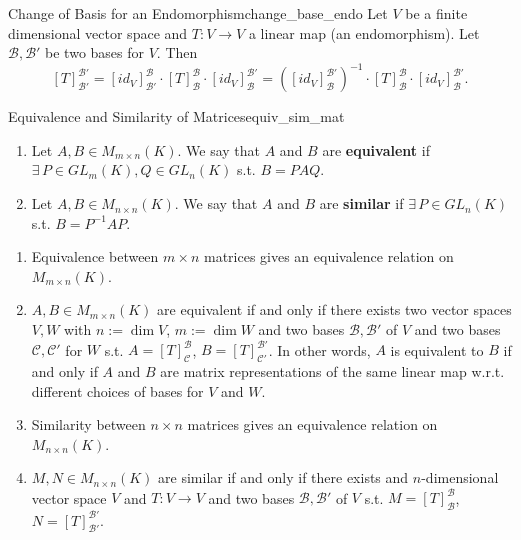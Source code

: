 \begin{corollary}{Change of Basis for an Endomorphism}{change_base_endo}
	Let $V$ be a finite dimensional vector space and $T:V \to V$ a linear map (an endomorphism). Let $\mathcal{B}, \mathcal{B'}$ be two bases for $V$. Then
	\[
	[T]^{\mathcal{B'}}_{\mathcal{B'}} = [id_V]^{\mathcal{B}}_{\mathcal{B'}} \cdot [T]^{\mathcal{B}}_{\mathcal{B}} \cdot [id_V]^{\mathcal{B'}}_{\mathcal{B}} = ([id_V]^{\mathcal{B'}}_{\mathcal{B}})^{-1} \cdot [T]^{\mathcal{B}}_{\mathcal{B}} \cdot [id_V]^{\mathcal{B'}}_{\mathcal{B}}.
	\]
\end{corollary}

\begin{definition}{Equivalence and Similarity of Matrices}{equiv_sim_mat}
	\begin{enumerate}
		\item Let $A, B \in M_{m \times n}(K)$. We say that $A$ and $B$ are \textbf{equivalent} if $\exists\, P \in GL_m(K), Q \in GL_n(K)$ s.t. $B = PAQ$.
		\item Let $A, B \in M_{n \times n}(K)$. We say that $A$ and $B$ are \textbf{similar} if $\exists\, P \in GL_n(K)$ s.t. $B = P^{-1} A P$.
	\end{enumerate}
\end{definition}

\begin{remark}
	\begin{enumerate}
		\item Equivalence between $m \times n$ matrices gives an equivalence relation on $M_{m \times n}(K)$.
		\item $A, B \in M_{m \times n}(K)$ are equivalent if and only if there exists two vector spaces $V, W$ with $n:= \dim V$, $m := \dim W$ and two bases $\mathcal{B}, \mathcal{B'}$ of $V$ and two bases $\mathcal{C}, \mathcal{C'}$ for $W$ s.t. $A = [T]^{\mathcal{B}}_{\mathcal{C}}$, $B = [T]^{\mathcal{B'}}_{\mathcal{C'}}$. In other words, $A$ is equivalent to $B$ if and only if $A$ and $B$ are matrix representations of the same linear map w.r.t. different choices of bases for $V$ and $W$.
		\item Similarity between $n \times n$ matrices gives an equivalence relation on $M_{n \times n}(K)$.
		\item $M,N \in M_{n \times n}(K)$ are similar if and only if there exists and $n$-dimensional vector space $V$ and $T:V \to V$ and two bases $\mathcal{B}, \mathcal{B'}$ of $V$ s.t. $M = [T]^{\mathcal{B}}_{\mathcal{B}}$, $N = [T]^{\mathcal{B'}}_{\mathcal{B'}}$.
	\end{enumerate}
\end{remark}

